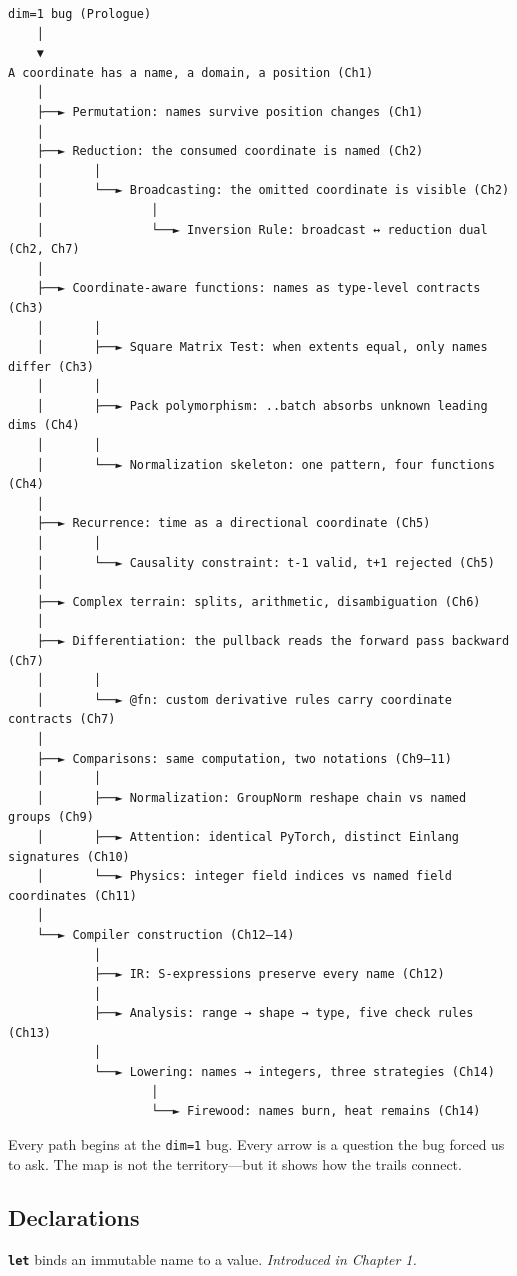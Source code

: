 \documentclass[11pt,titlepage]{article}
\begin{document}
\begin{verbatim}
dim=1 bug (Prologue)
    │
    ▼
A coordinate has a name, a domain, a position (Ch1)
    │
    ├──► Permutation: names survive position changes (Ch1)
    │
    ├──► Reduction: the consumed coordinate is named (Ch2)
    │       │
    │       └──► Broadcasting: the omitted coordinate is visible (Ch2)
    │               │
    │               └──► Inversion Rule: broadcast ↔ reduction dual (Ch2, Ch7)
    │
    ├──► Coordinate-aware functions: names as type-level contracts (Ch3)
    │       │
    │       ├──► Square Matrix Test: when extents equal, only names differ (Ch3)
    │       │
    │       ├──► Pack polymorphism: ..batch absorbs unknown leading dims (Ch4)
    │       │
    │       └──► Normalization skeleton: one pattern, four functions (Ch4)
    │
    ├──► Recurrence: time as a directional coordinate (Ch5)
    │       │
    │       └──► Causality constraint: t-1 valid, t+1 rejected (Ch5)
    │
    ├──► Complex terrain: splits, arithmetic, disambiguation (Ch6)
    │
    ├──► Differentiation: the pullback reads the forward pass backward (Ch7)
    │       │
    │       └──► @fn: custom derivative rules carry coordinate contracts (Ch7)
    │
    ├──► Comparisons: same computation, two notations (Ch9–11)
    │       │
    │       ├──► Normalization: GroupNorm reshape chain vs named groups (Ch9)
    │       ├──► Attention: identical PyTorch, distinct Einlang signatures (Ch10)
    │       └──► Physics: integer field indices vs named field coordinates (Ch11)
    │
    └──► Compiler construction (Ch12–14)
            │
            ├──► IR: S-expressions preserve every name (Ch12)
            │
            ├──► Analysis: range → shape → type, five check rules (Ch13)
            │
            └──► Lowering: names → integers, three strategies (Ch14)
                    │
                    └──► Firewood: names burn, heat remains (Ch14)
\end{verbatim}

Every path begins at the \texttt{dim=1} bug. Every arrow is a question
the bug forced us to ask. The map is not the territory---but it shows
how the trails connect.

\vspace{2em}

\hypertarget{declarations}{%
\subsection{Declarations}\label{declarations}}

\textbf{\texttt{let}} binds an immutable name to a value.
\emph{Introduced in Chapter 1.}
\end{document}
